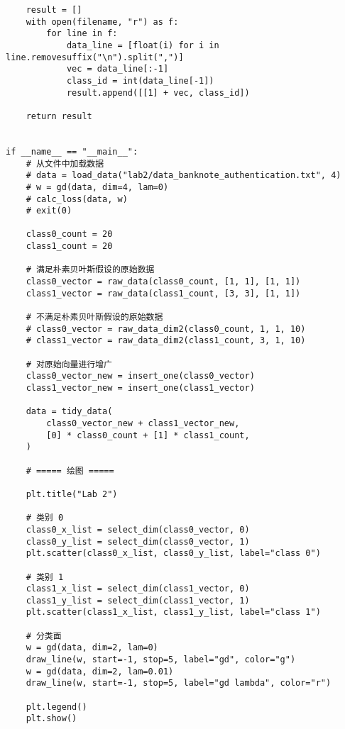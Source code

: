 \begin{verbatim}
    result = []
    with open(filename, "r") as f:
        for line in f:
            data_line = [float(i) for i in line.removesuffix("\n").split(",")]
            vec = data_line[:-1]
            class_id = int(data_line[-1])
            result.append([[1] + vec, class_id])

    return result


if __name__ == "__main__":
    # 从文件中加载数据
    # data = load_data("lab2/data_banknote_authentication.txt", 4)
    # w = gd(data, dim=4, lam=0)
    # calc_loss(data, w)
    # exit(0)

    class0_count = 20
    class1_count = 20

    # 满足朴素贝叶斯假设的原始数据
    class0_vector = raw_data(class0_count, [1, 1], [1, 1])
    class1_vector = raw_data(class1_count, [3, 3], [1, 1])

    # 不满足朴素贝叶斯假设的原始数据
    # class0_vector = raw_data_dim2(class0_count, 1, 1, 10)
    # class1_vector = raw_data_dim2(class1_count, 3, 1, 10)

    # 对原始向量进行增广
    class0_vector_new = insert_one(class0_vector)
    class1_vector_new = insert_one(class1_vector)

    data = tidy_data(
        class0_vector_new + class1_vector_new,
        [0] * class0_count + [1] * class1_count,
    )

    # ===== 绘图 =====

    plt.title("Lab 2")

    # 类别 0
    class0_x_list = select_dim(class0_vector, 0)
    class0_y_list = select_dim(class0_vector, 1)
    plt.scatter(class0_x_list, class0_y_list, label="class 0")

    # 类别 1
    class1_x_list = select_dim(class1_vector, 0)
    class1_y_list = select_dim(class1_vector, 1)
    plt.scatter(class1_x_list, class1_y_list, label="class 1")

    # 分类面
    w = gd(data, dim=2, lam=0)
    draw_line(w, start=-1, stop=5, label="gd", color="g")
    w = gd(data, dim=2, lam=0.01)
    draw_line(w, start=-1, stop=5, label="gd lambda", color="r")

    plt.legend()
    plt.show()

\end{verbatim}
